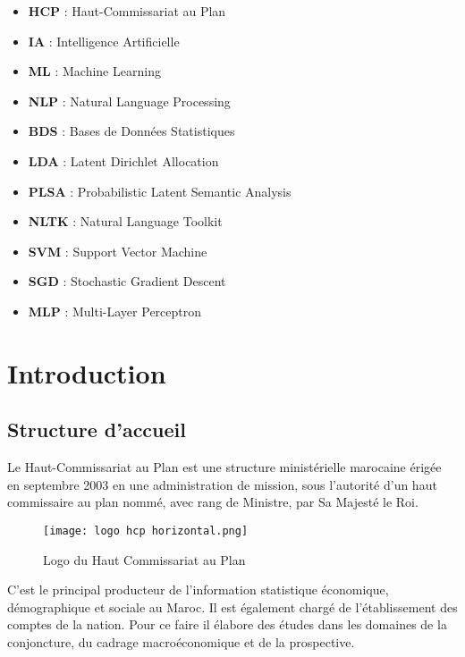 \documentclass[a4paper,french,12pt]{article}
\begin{document}
\begin{itemize}
    \item \textbf{HCP} : Haut-Commissariat au Plan
    \item \textbf{IA} : Intelligence Artificielle
    \item \textbf{ML} : Machine Learning
    \item \textbf{NLP} : Natural Language Processing
    \item \textbf{BDS} : Bases de Données Statistiques
    \item \textbf{LDA} : Latent Dirichlet Allocation
    \item \textbf{PLSA} : Probabilistic Latent Semantic Analysis
    \item \textbf{NLTK} : Natural Language Toolkit
    \item \textbf{SVM} : Support Vector Machine
    \item \textbf{SGD} : Stochastic Gradient Descent
    \item \textbf{MLP} : Multi-Layer Perceptron
\end{itemize}

\newpage

\tableofcontents

\newpage

\section{Introduction}
\label{sec:Introduction}

\subsection{Structure d'accueil}

Le Haut-Commissariat au Plan est une structure ministérielle marocaine érigée en septembre 2003 en une administration de mission, sous l’autorité d’un haut commissaire au plan nommé, avec rang de Ministre, par Sa Majesté le Roi.\\

\begin{figure}[!h]
    \centering
    \texttt{[image: logo hcp horizontal.png]}
    \caption{Logo du Haut Commissariat au Plan}
\end{figure}

C'est le principal producteur de l’information statistique économique, démographique et sociale au Maroc. Il est également chargé de l’établissement des comptes de la nation. Pour ce faire il élabore des études dans les domaines de la conjoncture, du cadrage macroéconomique et de la prospective.\\
\end{document}
